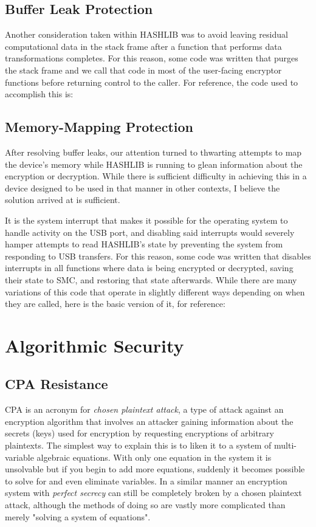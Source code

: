 \documentclass[titlepage]{article}
\begin{document}
		\subsection{Buffer Leak Protection}
			Another consideration taken within HASHLIB was to avoid leaving residual computational data in the stack frame after a function that performs data transformations completes. For this reason, some code was written that purges the stack frame and we call that code in most of the user-facing encryptor functions before returning control to the caller. For reference, the code used to accomplish this is:
			
		\subsection{Memory-Mapping Protection}
		  	After resolving buffer leaks, our attention turned to thwarting attempts to map the device's memory while HASHLIB is running to glean information about the encryption or decryption. While there is sufficient difficulty in achieving this in a device designed to be used in that manner in other contexts, I believe the solution arrived at is sufficient.
		  	
		  	It is the system interrupt that makes it possible for the operating system to handle activity on the USB port, and disabling said interrupts would severely hamper attempts to read HASHLIB's state by preventing the system from responding to USB transfers. For this reason, some code was written that disables interrupts in all functions where data is being encrypted or decrypted, saving their state to SMC, and restoring that state afterwards. While there are many variations of this code that operate in slightly different ways depending on when they are called, here is the basic version of it, for reference:
		  	
		  	
	\section{Algorithmic Security}
		\subsection{CPA Resistance}
			CPA is an acronym for \textit{chosen plaintext attack}, a type of attack against an encryption algorithm that involves an attacker gaining information about the secrets (keys) used for encryption by requesting encryptions of arbitrary plaintexts. The simplest way to explain this is to liken it to a system of multi-variable algebraic equations. With only one equation in the system it is unsolvable but if you begin to add more equations, suddenly it becomes possible to solve for and even eliminate variables. In a similar manner an encryption system with \textit{perfect secrecy} can still be completely broken by a chosen plaintext attack, although the methods of doing so are vastly more complicated than merely "solving a system of equations".
			
\end{document}
